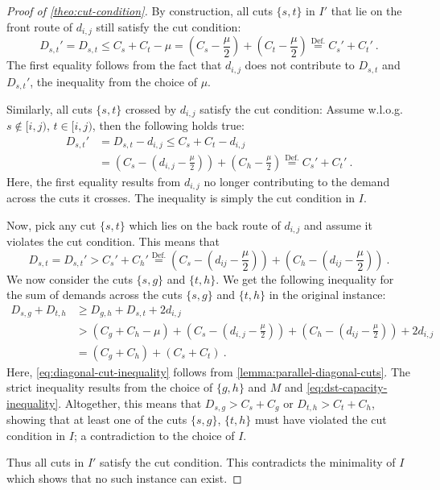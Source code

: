 \begin{proof}[Proof of \cref{theo:cut-condition}]
	By construction, all cuts $\{s, t\}$ in $I'$ that lie on the front route of $d_{i,j}$ still satisfy the cut condition:
	\begin{equation}
		D_{s,t}' = D_{s,t} \leq C_{s} + C_{t} - \mu = (C_{s} - \frac{\mu}{2}) + (C_{t} - \frac{\mu}{2}) \stackrel{\mathrm{Def.}}{=} C_{s}' + C_{t}' \ .
	\end{equation}
	The first equality follows from the fact that $d_{i,j}$ does not contribute to $D_{s,t}$ and $D_{s,t}'$, the inequality from the choice of $\mu$.
	
	Similarly, all cuts $\{s, t\}$ crossed by $d_{i,j}$ satisfy the cut condition:
	Assume w.l.o.g. $s \notin [i, j)$, $t \in [i, j)$, then the following holds true:
	\begin{align}
		D_{s,t}' &= D_{s,t} - d_{i,j} \leq C_s + C_t - d_{i,j} \\
		&= \left(C_s - \left(d_{i,j} - \frac{\mu}{2}\right)\right) + \left(C_h - \frac{\mu}{2}\right) \stackrel{\mathrm{Def.}}{=} C_s' + C_t' \ .
	\end{align}
	Here, the first equality results from $d_{i,j}$ no longer contributing to the demand across the cuts it crosses.
	The inequality is simply the cut condition in $I$.
	
	Now, pick any cut $\{s, t\}$ which lies on the back route of $d_{i,j}$ and assume it violates the cut condition.
	This means that
	\begin{equation}
		\label{eq:dst-capacity-inequality}
		D_{s,t} = D_{s,t}' > C_s' + C_h' \stackrel{\mathrm{Def.}}{=} \left(C_s - \left(d_{ij} - \frac{\mu}{2}\right)\right) + \left(C_h - \left(d_{ij} - \frac{\mu}{2}\right)\right) \ .
	\end{equation}
	We now consider the cuts $\{s, g\}$ and $\{t, h\}$.
	We get the following inequality for the sum of demands across the cuts $\{s, g\}$ and $\{t, h\}$ in the original instance:
	\begin{align}
		D_{s,g} + D_{t,h} &\geq D_{g,h} + D_{s,t} + 2 d_{i,j} \label{eq:diagonal-cut-inequality}\\
		&> (C_g + C_h - \mu) +  \left(C_s - \left(d_{i,j} - \frac{\mu}{2}\right)\right) + \left(C_h - \left(d_{ij} - \frac{\mu}{2}\right)\right) + 2 d_{i,j} \label{eq:strict-capacity-inequality}\\
		&= (C_g + C_h) + (C_s + C_t) \ .
	\end{align}
	Here, \ref{eq:diagonal-cut-inequality} follows from \cref{lemma:parallel-diagonal-cuts}.
	The strict inequality results from the choice of $\{g, h\}$ and $M$ and \cref{eq:dst-capacity-inequality}.
	Altogether, this means that $D_{s,g} > C_s + C_g$ or $D_{t,h} > C_t + C_h$, showing that at least one of the cuts $\{s, g\}$, $\{t, h\}$ must have violated the cut condition in $I$; a contradiction to the choice of $I$.
	
	Thus all cuts in $I'$ satisfy the cut condition.
	This contradicts the minimality of $I$ which shows that no such instance can exist.
\end{proof}

